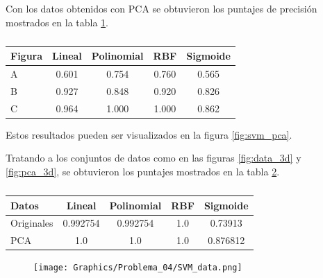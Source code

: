 Con los datos obtenidos con PCA se obtuvieron los puntajes de precisión mostrados en la tabla \ref{table:pca_2d}.

\begin{table}[H]
    \centering
    \begin{tabular}{lcccc} \hline
        Figura & Lineal & Polinomial & RBF   & Sigmoide \\ \hline
        A      & 0.601  & 0.754      & 0.760 & 0.565    \\
        B      & 0.927  & 0.848      & 0.920 & 0.826    \\
        C      & 0.964  & 1.000      & 1.000 & 0.862    \\ \hline
    \end{tabular}
    \caption{}
    \label{table:pca_2d}
\end{table}

Estos resultados pueden ser visualizados en la figura \ref{fig:svm_pca}.

Tratando a los conjuntos de datos como en las figuras \ref{fig:data_3d} y \ref{fig:pca_3d}, se obtuvieron los puntajes mostrados en la tabla \ref{table:results_3d}.

\begin{table}[H]
    \centering
    \begin{tabular}{lcccc} \hline
        Datos      & Lineal   & Polinomial & RBF & Sigmoide \\ \hline
        Originales & 0.992754 & 0.992754   & 1.0 & 0.73913  \\
        PCA        & 1.0      & 1.0        & 1.0 & 0.876812 \\ \hline
    \end{tabular}
    \caption{}
    \label{table:results_3d}
\end{table}

\pagebreak

\begin{figure}[H]
    \centering
    \texttt{[image: Graphics/Problema\_04/SVM\_data.png]}
    \caption{}
    \label{fig:svm_data}
\end{figure}

\pagebreak

